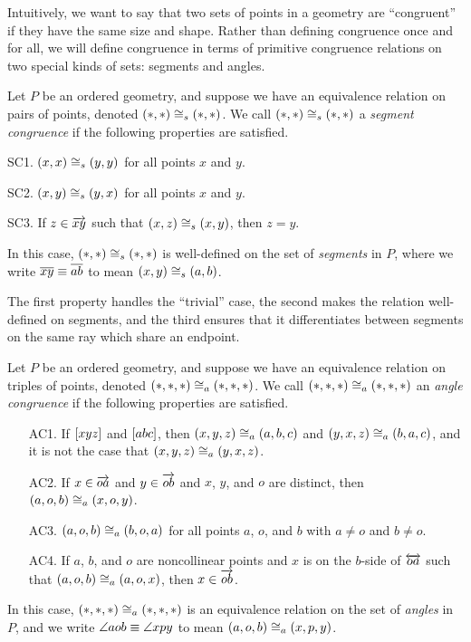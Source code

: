 Intuitively, we want to say that two sets of points in a geometry are ``congruent'' if they have the same size and shape. Rather than defining congruence once and for all, we will define congruence in terms of primitive congruence relations on two special kinds of sets: segments and angles.

\begin{dfn}
Let \(P\) be an ordered geometry, and suppose we have an equivalence relation on pairs of points, denoted $(\ast,\ast) \cong_s (\ast,\ast)$. We call $(\ast,\ast) \cong_s (\ast,\ast)$ a \emph{segment congruence} if the following properties are satisfied.
\begin{proplist}
\item[SC1.] $(x,x) \cong_s (y,y)$ for all points $x$ and $y$.
\item[SC2.] $(x,y) \cong_s (y,x)$ for all points $x$ and $y$.
\item[SC3.] If $z \in \overrightarrow{xy}$ such that $(x,z) \cong_s (x,y)$, then $z = y$.
\end{proplist}
In this case, $(\ast,\ast) \cong_s (\ast,\ast)$ is well-defined on the set of \emph{segments} in $P$, where we write $\overline{xy} \equiv \overline{ab}$ to mean $(x,y) \cong_s (a,b)$.
\end{dfn}

The first property handles the ``trivial'' case, the second makes the relation well-defined on segments, and the third ensures that it differentiates between segments on the same ray which share an endpoint.

\begin{dfn}
Let $P$ be an ordered geometry, and suppose we have an equivalence relation on triples of points, denoted $(\ast,\ast,\ast) \cong_a (\ast,\ast,\ast)$. We call $(\ast,\ast,\ast) \cong_a (\ast,\ast,\ast)$ an \emph{angle congruence} if the following properties are satisfied.
\begin{itemize}
\item[AC1.] If $[ x y z ]$ and $[ a b c ]$, then $(x,y,z) \cong_a (a,b,c)$ and $(y,x,z) \cong_a (b,a,c)$, and it is not the case that $(x,y,z) \cong_a (y,x,z)$.
\item[AC2.] If $x \in \overrightarrow{oa}$ and $y \in \overrightarrow{ob}$ and $x$, $y$, and $o$ are distinct, then $(a,o,b) \cong_a (x,o,y)$.
\item[AC3.] $(a,o,b) \cong_a (b,o,a)$ for all points $a$, $o$, and $b$ with $a \neq o$ and $b \neq o$.
\item[AC4.] If $a$, $b$, and $o$ are noncollinear points and $x$ is on the $b$-side of $\overleftrightarrow{oa}$ such that $(a,o,b) \cong_a (a,o,x)$, then $x \in \overrightarrow{ob}$.
\end{itemize}
In this case, $(\ast,\ast,\ast) \cong_a (\ast,\ast,\ast)$ is an equivalence relation on the set of \emph{angles} in $P$, and we write $\angle{aob} \equiv \angle{xpy}$ to mean $(a,o,b) \cong_a (x,p,y)$.
\end{dfn}

